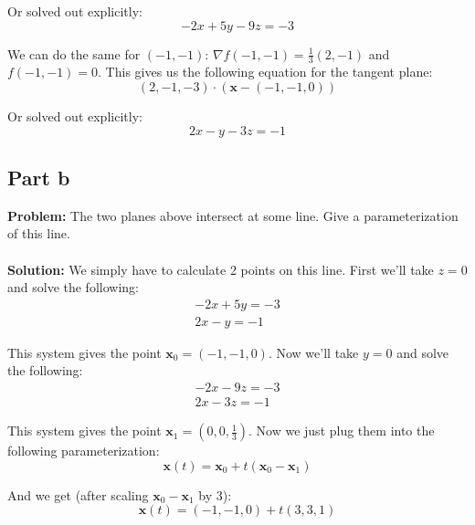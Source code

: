 \documentclass{article}
\begin{document}
Or solved out explicitly:
$$-2x+5y-9z=-3$$

We can do the same for $(-1,-1)$: $\nabla f(-1,-1)=\frac{1}{3}(2,-1)$ and $f(-1,-1)=0$. This gives us the following equation for the tangent plane:
$$(2,-1,-3)\cdot(\mathbf x-(-1,-1,0))$$

Or solved out explicitly:
$$2x-y-3z=-1$$

\subsection*{Part b}
\textbf{Problem:} The two planes above intersect at some line. Give a parameterization of this line.
\\\\
\textbf{Solution:} We simply have to calculate 2 points on this line. First we'll take $z=0$ and solve the following:
\begin{align*}
  -2x+5y=-3\\
  2x-y=-1
\end{align*}

This system gives the point $\mathbf x_0=(-1,-1,0)$. Now we'll take $y=0$ and solve the following:
\begin{align*}
  -2x-9z=-3\\
  2x-3z=-1
\end{align*}

This system gives the point $\mathbf x_1=(0,0,\frac{1}{3})$. Now we just plug them into the following parameterization:
$$\mathbf x(t)=\mathbf x_0+t(\mathbf x_0-\mathbf x_1)$$

And we get (after scaling $\mathbf x_0-\mathbf x_1$ by 3):
$$\mathbf x(t)=(-1,-1,0)+t(3,3,1)$$
\end{document}
